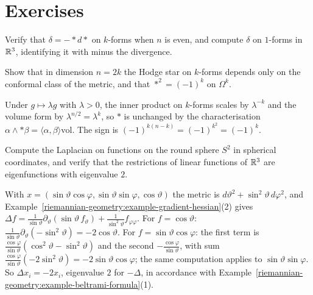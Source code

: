 \section{Exercises}\label{riemannian-geometry:section-exercises}

\begin{exercise}\label{riemannian-geometry:exercise-hodge-star-signs}
Verify that $\delta = -*d*$ on $k$-forms when $n$ is even, and compute $\delta$ on $1$-forms in $\mathbb{R}^3$, identifying it with minus the divergence.
\end{exercise}

\begin{exercise}\label{riemannian-geometry:exercise-conformal}
Show that in dimension $n = 2k$ the Hodge star on $k$-forms depends only on the conformal class of the metric, and that $*^2 = (-1)^k$ on $\Omega^k$.
\end{exercise}

\begin{solution}
Under $g \mapsto \lambda g$ with $\lambda > 0$, the inner product on $k$-forms scales by $\lambda^{-k}$ and the volume form by $\lambda^{n/2} = \lambda^k$, so $*$ is unchanged by the characterisation
$\alpha \wedge *\beta = \langle\alpha,\beta\rangle\mathrm{vol}$. The sign is $(-1)^{k(n-k)} = (-1)^{k^2} = (-1)^k$.
\end{solution}

\begin{exercise}\label{riemannian-geometry:exercise-laplacian-sphere}
Compute the Laplacian on functions on the round sphere $S^2$ in spherical coordinates, and verify that the restrictions of linear functions of $\mathbb{R}^3$ are eigenfunctions with eigenvalue $2$.
\end{exercise}

\begin{solution}
With $x = (\sin\vartheta\cos\varphi, \sin\vartheta\sin\varphi, \cos\vartheta)$ the metric is $d\vartheta^2 + \sin^2\vartheta\,d\varphi^2$, and Example~\ref{riemannian-geometry:example-gradient-hessian}(2) gives
$\Delta f = \frac{1}{\sin\vartheta}\partial_\vartheta(\sin\vartheta\,f_\vartheta) + \frac{1}{\sin^2\vartheta}f_{\varphi\varphi}$. For $f = \cos\vartheta$:
$\frac{1}{\sin\vartheta}\partial_\vartheta(-\sin^2\vartheta) = -2\cos\vartheta$. For $f = \sin\vartheta\cos\varphi$: the first term is
$\frac{\cos\varphi}{\sin\vartheta}(\cos^2\vartheta - \sin^2\vartheta)$ and the second $-\frac{\cos\varphi}{\sin\vartheta}$, with sum $\frac{\cos\varphi}{\sin\vartheta}(-2\sin^2\vartheta) = -2\sin\vartheta\cos\varphi$; the
same computation applies to $\sin\vartheta\sin\varphi$. So $\Delta x_i = -2x_i$, eigenvalue $2$ for $-\Delta$, in accordance with Example~\ref{riemannian-geometry:example-beltrami-formula}(1).
\end{solution}

